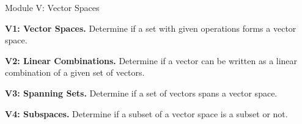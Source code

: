 
\begin{module}{Module V: Vector Spaces}

\begin{moduleStandards}
  \item \textbf{V1: Vector Spaces.}
        Determine if a set with given operations forms a vector space.
  \item \textbf{V2: Linear Combinations.}
        Determine if a vector can be written as a linear combination of
        a given set of vectors.
  \item \textbf{V3: Spanning Sets.}
        Determine if a set of vectors spans a vector space.
  \item \textbf{V4: Subspaces.}
        Determine if a subset of a vector space is a subset or not.
\end{moduleStandards}







\end{module}
